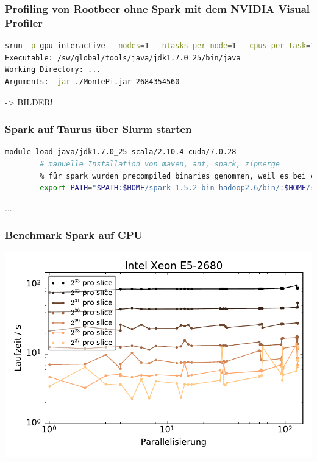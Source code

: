 \begin{frame}
\end{frame}


\begin{frame}[fragile]
    \frametitle{Profiling von Rootbeer ohne Spark mit dem NVIDIA Visual Profiler}
    \begin{lstlisting}[language=bash]
srun -p gpu-interactive --nodes=1 --ntasks-per-node=1 --cpus-per-task=1 --gres=gpu:2 --time=1:30:00 --mem-per-cpu=6000 --x11=first nvvp
Executable: /sw/global/tools/java/jdk1.7.0_25/bin/java
Working Directory: ...
Arguments: -jar ./MontePi.jar 2684354560
\end{lstlisting}
 -> BILDER!
\end{frame}


\begin{frame}[fragile]
    \frametitle{Spark auf Taurus über Slurm starten}
    \begin{lstlisting}[language=bash]
        module load java/jdk1.7.0_25 scala/2.10.4 cuda/7.0.28
        # manuelle Installation von maven, ant, spark, zipmerge
        % für spark wurden precompiled binaries genommen, weil es bei der Kompilation auch Probleme gab, die nicht behoben werden konnten
        export PATH="$PATH:$HOME/spark-1.5.2-bin-hadoop2.6/bin/:$HOME/spark-1.5.2-bin-hadoop2.6/sbin/:$HOME/programs/bin"
    \end{lstlisting}
    ...
\end{frame}


\begin{frame}
    \frametitle{Benchmark Spark auf CPU}
    \centerline{\includegraphics[width=0.9\linewidth]{cluster-strong-scaling-cpu.pdf}}
\end{frame}


